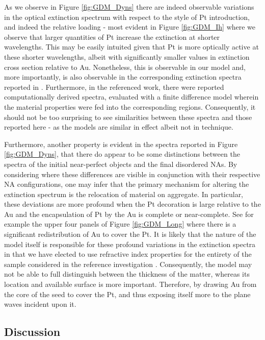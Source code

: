 As we observe in Figure \ref{fig:GDM_Dyns} there are indeed observable variations in the optical extinction spectrum with respect to the style of Pt introduction, and indeed the relative loading - most evident in Figure \ref{fig:GDM_Ih} where we observe that larger quantities of Pt increase the extinction at shorter wavelengths. This may be easily intuited given that Pt is more optically active at these shorter wavelengths, albeit with significantly smaller values in extinction cross section relative to Au. Nonetheless, this is observable in our model and, more importantly, is also observable in the corresponding extinction spectra reported in \cite{JorgeStructure}. Furthermore, in the referenced work, there were reported computationally derived spectra, evaluated with a finite difference model wherein the material properties were fed into the corresponding regions. Consequently, it should not be too surprising to see similarities between these spectra and those reported here - as the models are similar in effect albeit not in technique.

Furthermore, another property is evident in the spectra reported in Figure \ref{fig:GDM_Dyns}, that there do appear to be some distinctions between the spectra of the initial near-perfect objects and the final disordered NAs. By considering  where these differences are visible in conjunction with their respective NA configurations, one may infer that the primary mechanism for altering the extinction spectrum is the relocation of material on aggregate. In particular, these deviations are more profound when the Pt decoration is large relative to the Au and the encapsulation of Pt by the Au is complete or near-complete. See for example the upper four panels of Figure \ref{fig:GDM_Long} where there is a significant redistribution of Au to cover the Pt. It is likely that the nature of the model itself is responsible for these profound variations in the extinction spectra in that we have elected to use refractive index properties for the entirety of the sample considered in the reference investigation \cite{PhysRevB.6.4370}. Consequently, the model may not be able to full distinguish between the thickness of the matter, whereas its location and available surface is more important. Therefore, by drawing Au from the core of the seed to cover the Pt, and thus exposing itself more to the plane waves incident upon it.

\subsection{Discussion}

